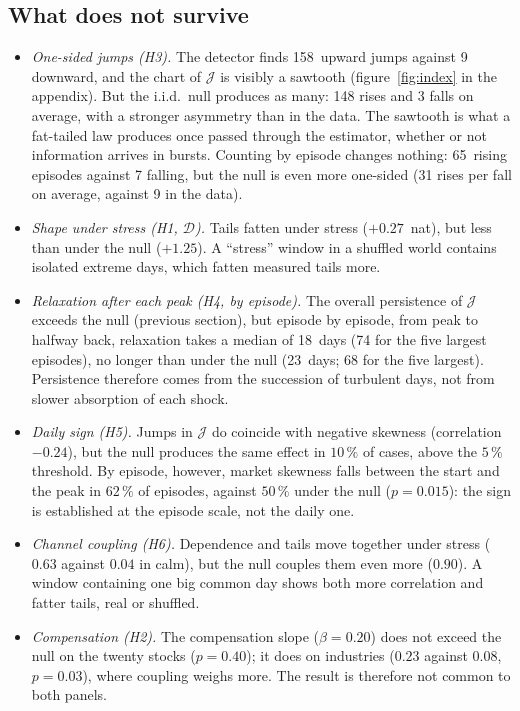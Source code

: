 \documentclass[11pt]{article}
\theoremstyle{definition}
\newcommand{\JJ}{\mathcal{J}}
\newcommand{\DD}{\mathcal{D}}
\begin{document}
\subsection{What does not survive}

\begin{itemize}
\item \emph{One-sided jumps (H3).} The detector finds 158~upward jumps against
9 downward, and the chart of $\JJ$ is visibly a sawtooth (figure~\ref{fig:index}
in the appendix). But the i.i.d.\ null produces as many: 148 rises and 3 falls
on average, with a stronger asymmetry than in the data. The sawtooth is what a
fat-tailed law produces once passed through the estimator, whether or not
information arrives in bursts. Counting by episode changes nothing:
65~rising episodes against 7 falling, but the null is even more one-sided
(31 rises per fall on average, against 9 in the data).
\item \emph{Shape under stress (H1, $\DD$).} Tails fatten under stress
($+0.27$~nat), but less than under the null ($+1.25$). A ``stress'' window in a
shuffled world contains isolated extreme days, which fatten measured tails
more.
\item \emph{Relaxation after each peak (H4, by episode).} The overall
persistence of $\JJ$ exceeds the null (previous section), but episode by
episode, from peak to halfway back, relaxation takes a median of 18~days (74
for the five largest episodes), no longer than under the null (23~days; 68 for
the five largest). Persistence therefore comes from the succession of
turbulent days, not from slower absorption of each shock.
\item \emph{Daily sign (H5).} Jumps in $\JJ$ do coincide with negative
skewness (correlation $-0.24$), but the null produces the same effect in
$10\,\%$ of cases, above the $5\,\%$ threshold. By episode, however, market
skewness falls between the start and the peak in $62\,\%$ of episodes, against
$50\,\%$ under the null ($p=0.015$): the sign is established at the episode
scale, not the daily one.
\item \emph{Channel coupling (H6).} Dependence and tails move together under
stress ($0.63$ against $0.04$ in calm), but the null couples them even more
($0.90$). A window containing one big common day shows both more correlation
and fatter tails, real or shuffled.
\item \emph{Compensation (H2).} The compensation slope ($\beta=0.20$) does not
exceed the null on the twenty stocks ($p=0.40$); it does on industries ($0.23$
against $0.08$, $p=0.03$), where coupling weighs more. The result is
therefore not common to both panels.
\end{itemize}
\end{document}
